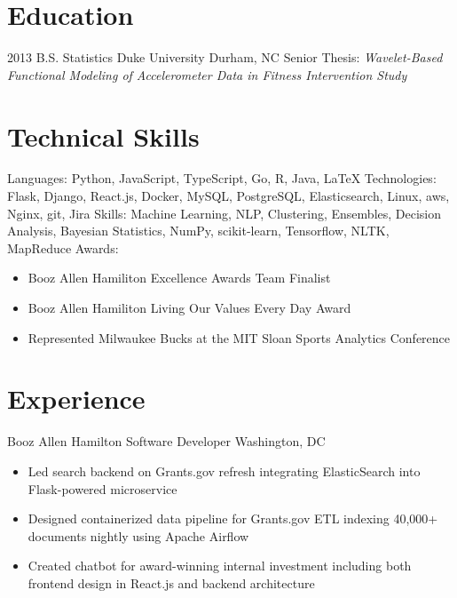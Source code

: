 \documentclass[11pt,a4paper,sans]{moderncv}        %
\begin{document}
\makecvtitle
\vspace{-6ex}                                      %

\section{Education}
\cventry
	{2013}
	{B.S. Statistics}
	{Duke University}
	{Durham, NC}
	{}
	{Senior Thesis: \textit{Wavelet-Based Functional Modeling of Accelerometer Data in Fitness Intervention Study}}

\section{Technical Skills}
\cvitem
  {Languages:}
  {Python, JavaScript, TypeScript, Go, R, Java, \LaTeX}
\cvitem
  {Technologies:}
  {Flask, Django, React.js, Docker, MySQL, PostgreSQL, Elasticsearch, Linux, aws, Nginx, git, Jira}
\cvitem
  {Skills:}
  {Machine Learning, NLP, Clustering, Ensembles, Decision Analysis, Bayesian Statistics, NumPy, scikit-learn, Tensorflow, NLTK, MapReduce}
\cvitem
  {Awards:}
  {
    \begin{itemize}
		\item{Booz Allen Hamiliton Excellence Awards Team Finalist}
		\item{Booz Allen Hamiliton Living Our Values Every Day Award}
		\item{Represented Milwaukee Bucks at the MIT Sloan Sports Analytics Conference}
    \end{itemize}
  }

\vspace{-3ex}
\section{Experience}
  {Booz Allen Hamilton Software Developer}
  {}
  {Washington, DC}
  {}
  {
    \begin{itemize}
		\item{Led search backend on Grants.gov refresh integrating ElasticSearch into Flask-powered microservice}
 		\item{Designed containerized data pipeline for Grants.gov ETL indexing 40,000+ documents nightly using Apache Airflow}
		\item{Created chatbot for award-winning internal investment including both frontend design in React.js and backend architecture}
    \end{itemize}
  }
\end{document}
